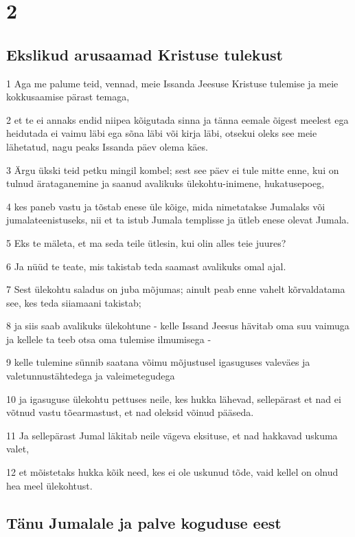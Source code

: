 \chapter{2}

\section*{Ekslikud arusaamad Kristuse tulekust}

\par 1 Aga me palume teid, vennad, meie Issanda Jeesuse Kristuse tulemise ja meie kokkusaamise pärast temaga,
\par 2 et te ei annaks endid niipea kõigutada sinna ja tänna eemale õigest meelest ega heidutada ei vaimu läbi ega sõna läbi või kirja läbi, otsekui oleks see meie lähetatud, nagu peaks Issanda päev olema käes.
\par 3 Ärgu ükski teid petku mingil kombel; sest see päev ei tule mitte enne, kui on tulnud ärataganemine ja saanud avalikuks ülekohtu-inimene, hukatusepoeg,
\par 4 kes paneb vastu ja tõstab enese üle kõige, mida nimetatakse Jumalaks või jumalateenistuseks, nii et ta istub Jumala templisse ja ütleb enese olevat Jumala.
\par 5 Eks te mäleta, et ma seda teile ütlesin, kui olin alles teie juures?
\par 6 Ja nüüd te teate, mis takistab teda saamast avalikuks omal ajal.
\par 7 Sest ülekohtu saladus on juba mõjumas; ainult peab enne vahelt kõrvaldatama see, kes teda siiamaani takistab;
\par 8 ja siis saab avalikuks ülekohtune - kelle Issand Jeesus hävitab oma suu vaimuga ja kellele ta teeb otsa oma tulemise ilmumisega -
\par 9 kelle tulemine sünnib saatana võimu mõjustusel igasuguses valeväes ja valetunnustähtedega ja valeimetegudega
\par 10 ja igasuguse ülekohtu pettuses neile, kes hukka lähevad, sellepärast et nad ei võtnud vastu tõearmastust, et nad oleksid võinud pääseda.
\par 11 Ja sellepärast Jumal läkitab neile vägeva eksituse, et nad hakkavad uskuma valet,
\par 12 et mõistetaks hukka kõik need, kes ei ole uskunud tõde, vaid kellel on olnud hea meel ülekohtust.

\section*{Tänu Jumalale ja palve koguduse eest}

